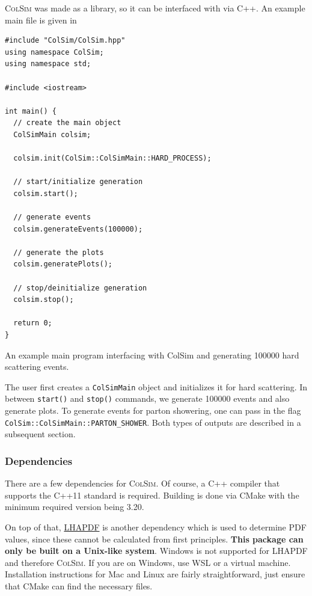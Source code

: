 \textsc{ColSim} was made as a library, so it can be interfaced with via C++. An example main file is given in 

\begin{listing}[!ht]
\begin{verbatim}
#include "ColSim/ColSim.hpp"
using namespace ColSim;
using namespace std;

#include <iostream>

int main() {
  // create the main object
  ColSimMain colsim;

  colsim.init(ColSim::ColSimMain::HARD_PROCESS);

  // start/initialize generation
  colsim.start();

  // generate events
  colsim.generateEvents(100000);
	
  // generate the plots
  colsim.generatePlots();

  // stop/deinitialize generation
  colsim.stop();
    
  return 0;
}
\end{verbatim}
\caption{An example main program interfacing with ColSim and generating 100000 hard scattering events.}
\label{listing:colsim-main}
\end{listing}

The user first creates a \texttt{ColSimMain} object and initializes it for hard scattering. In between \texttt{start()} and \texttt{stop()} commands, we generate 100000 events and also generate plots. To generate events for parton showering, one can pass in the flag \texttt{ColSim::ColSimMain::PARTON_SHOWER}. Both types of outputs are described in a subsequent section.

\subsubsection{Dependencies}

There are a few dependencies for \textsc{ColSim}. Of course, a C++ compiler that supports the C++11 standard is required. Building is done via CMake with the minimum required version being 3.20.

On top of that, \href{https://www.lhapdf.org/}{LHAPDF} is another dependency which is used to determine PDF values, since these cannot be calculated from first principles. \textbf{This package can only be built on a Unix-like system}. Windows is not supported for LHAPDF and therefore \textsc{ColSim}. If you are on Windows, use WSL or a virtual machine. Installation instructions for Mac and Linux are fairly straightforward, just ensure that CMake can find the necessary files.

